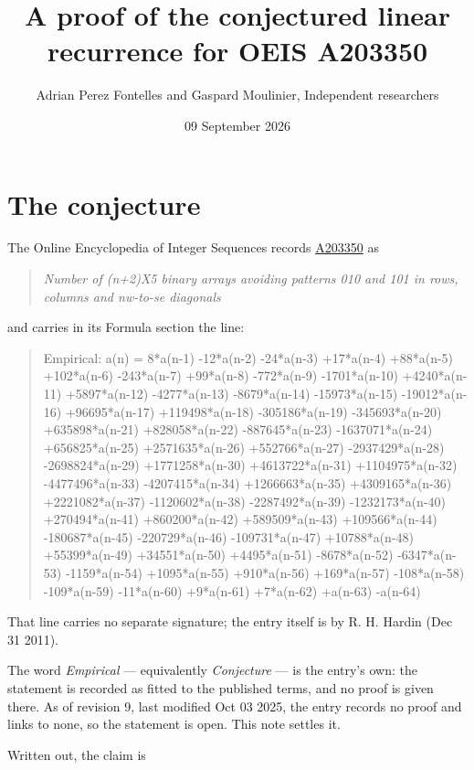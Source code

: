 \documentclass[11pt]{article}
\title{A proof of the conjectured linear recurrence for OEIS A203350}
\author{Adrian Perez Fontelles and Gaspard Moulinier, Independent researchers}
\date{09 September 2026}
\theoremstyle{definition}
\begin{document}
\maketitle
\section{The conjecture}

The Online Encyclopedia of Integer Sequences records \href{https://oeis.org/A203350}{A203350} as

\begin{quote}\itshape Number of (n+2)X5 binary arrays avoiding patterns 010 and 101 in rows, columns and nw-to-se diagonals\end{quote}

and carries in its Formula section the line:

\begin{quote}\ttfamily Empirical: a(n) = 8*a(n-1) -12*a(n-2) -24*a(n-3) +17*a(n-4) +88*a(n-5) +102*a(n-6) -243*a(n-7) +99*a(n-8) -772*a(n-9) -1701*a(n-10) +4240*a(n-11) +5897*a(n-12) -4277*a(n-13) -8679*a(n-14) -15973*a(n-15) -19012*a(n-16) +96695*a(n-17) +119498*a(n-18) -305186*a(n-19) -345693*a(n-20) +635898*a(n-21) +828058*a(n-22) -887645*a(n-23) -1637071*a(n-24) +656825*a(n-25) +2571635*a(n-26) +552766*a(n-27) -2937429*a(n-28) -2698824*a(n-29) +1771258*a(n-30) +4613722*a(n-31) +1104975*a(n-32) -4477496*a(n-33) -4207415*a(n-34) +1266663*a(n-35) +4309165*a(n-36) +2221082*a(n-37) -1120602*a(n-38) -2287492*a(n-39) -1232173*a(n-40) +270494*a(n-41) +860200*a(n-42) +589509*a(n-43) +109566*a(n-44) -180687*a(n-45) -220729*a(n-46) -109731*a(n-47) +10788*a(n-48) +55399*a(n-49) +34551*a(n-50) +4495*a(n-51) -8678*a(n-52) -6347*a(n-53) -1159*a(n-54) +1095*a(n-55) +910*a(n-56) +169*a(n-57) -108*a(n-58) -109*a(n-59) -11*a(n-60) +9*a(n-61) +7*a(n-62) +a(n-63) -a(n-64)\end{quote}

That line carries no separate signature; the entry itself is by R. H. Hardin (Dec 31 2011).

The word {\itshape Empirical} --- equivalently {\itshape Conjecture} --- is the entry's own: the statement is recorded as fitted to the published terms, and no proof is given there. As of revision 9, last modified Oct 03 2025, the entry records no proof and links to none, so the statement is open. This note settles it.

Written out, the claim is
\end{document}
